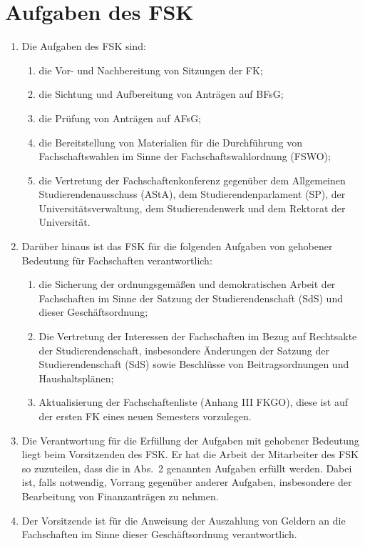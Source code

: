 \documentclass{article}
\begin{document}
\section{Aufgaben des FSK}
\begin{enumerate}[(1)]
    \item  Die Aufgaben des FSK sind:
    \begin{enumerate}[1.]
        \item die Vor- und Nachbereitung von Sitzungen der FK;
        \item die Sichtung und Aufbereitung von Anträgen auf BFsG;
        \item die Prüfung von Anträgen auf AFsG;
        \item die Bereitstellung von Materialien für die Durchführung von Fachschaftswahlen im Sinne der Fachschaftswahlordnung (FSWO);
        \item die Vertretung der Fachschaftenkonferenz gegenüber dem Allgemeinen Studierendenausschuss (AStA), dem Studierendenparlament (SP), der Universitätsverwaltung, dem Studierendenwerk und dem Rektorat der Universität.
    \end{enumerate}
    \item Darüber hinaus ist das FSK für die folgenden Aufgaben von gehobener Bedeutung für Fachschaften verantwortlich:
    \begin{enumerate}[1.]
        \item die Sicherung der ordnungsgemäßen und demokratischen Arbeit der Fachschaften im Sinne der Satzung der Studierendenschaft (SdS) und dieser Geschäftsordnung;
        \item Die Vertretung der Interessen der Fachschaften im Bezug auf Rechtsakte der Studierendenschaft, insbesondere Änderungen der Satzung der Studierendenschaft (SdS) sowie Beschlüsse von Beitragsordnungen und Haushaltsplänen;
        \item Aktualisierung der Fachschaftenliste (Anhang III FKGO), diese ist auf der ersten FK eines neuen Semesters vorzulegen.
    \end{enumerate}
    \item Die Verantwortung für die Erfüllung der Aufgaben mit gehobener Bedeutung liegt beim Vorsitzenden des FSK. 
    	Er hat die Arbeit der Mitarbeiter des FSK so zuzuteilen, dass die in Abs.\ 2 genannten Aufgaben erfüllt werden. 
    	Dabei ist, falls notwendig, Vorrang gegenüber anderer Aufgaben, insbesondere der Bearbeitung von Finanzanträgen zu nehmen.
    \item Der Vorsitzende ist für die Anweisung der Auszahlung von Geldern an die Fachschaften im Sinne dieser Geschäftsordnung verantwortlich. 

\end{enumerate}
\end{document}
